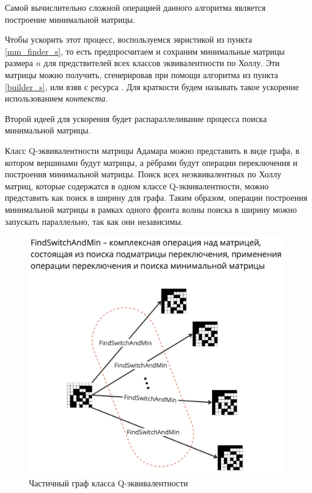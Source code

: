 Самой вычислительно сложной операцией данного алгоритма является построение минимальной матрицы.

Чтобы ускорить этот процесс, воспользуемся эвристикой из пункта \ref{mm_finder_s}, то есть предпросчитаем и сохраним минимальные матрицы размера $n$ для предствителей всех классов эквивалентности по Холлу. Эти матрицы можно получить, сгенерировав при помощи алгоритма из пункта \ref{builder_s}, или взяв с ресурса \cite{sloane:lhm}. Для краткости будем называть такое ускорение использованием {\it контекста}.

Второй идеей для ускорения будет распараллеливание процесса поиска минимальной матрицы.

Класс Q-эквивалентности матрицы Адамара можно представить в виде графа, в котором вершинами будут матрицы, а рёбрами будут операции переключения и построения минимальной матрицы. Поиск всех неэквивалентных по Холлу матриц, которые содержатся в одном классе Q-эквивалентности, можно представить как поиск в ширину для графа. Таким образом, операции построения минимальной матрицы в рамках одного фронта волны поиска в ширину можно запускать параллельно, так как они независимы.

\begin{figure}[h]
    \centering
    \includegraphics[scale=0.18]{res/img/graph.jpg}
    \caption{Частичный граф класса Q-эквивалентности}
    \label{fig:graph}
\end{figure}

